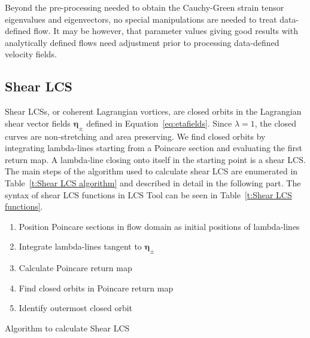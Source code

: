 \documentclass{article}
\begin{document}
Beyond the pre-processing needed to obtain the Cauchy-Green strain tensor eigenvalues and eigenvectors, no special manipulations are needed to treat data-defined flow. It may be however, that parameter values giving good results with analytically defined flows need adjustment prior to processing data-defined velocity fields.

\subsection{Shear LCS}

Shear LCSs, or coherent Lagrangian vortices, are closed orbits in the Lagrangian shear vector fields $\boldsymbol \eta_{\pm}$ defined in Equation~\eqref{eq:etafields}. Since $\lambda = 1$, the closed curves are non-stretching and area preserving. We find closed orbits by integrating lambda-lines starting from a Poincare section and evaluating the first return map. A lambda-line closing onto itself in the starting point is a shear LCS.
The main steps of the algorithm used to calculate shear LCS are enumerated in Table~\ref{t:Shear LCS algorithm} and described in detail in the following part. The syntax of shear LCS functions in LCS Tool can be seen in Table~\ref{t:Shear LCS functions}.

\begin{table}
\begin{center}
\begin{enumerate}
\item Position Poincare sections in flow domain as initial positions of lambda-lines
\item Integrate lambda-lines tangent to $\boldsymbol \eta_{\pm}$
\item Calculate Poincare return map
\item Find closed orbits in Poincare return map
\item Identify outermost closed orbit
\end{enumerate}
\end{center}
\caption{Algorithm to calculate Shear LCS}
\label{t:Shear LCS algorithm}
\end{table}
\end{document}
